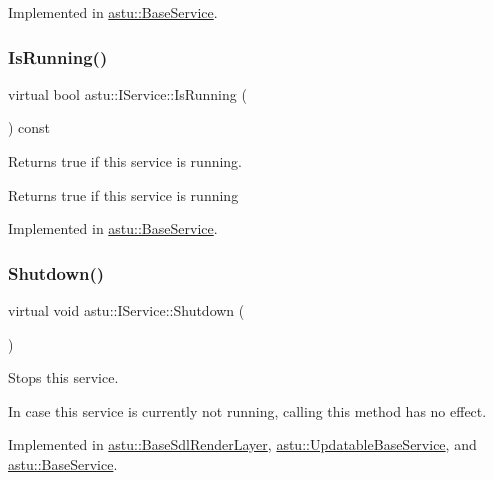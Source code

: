 Implemented in \hyperlink{classastu_1_1BaseService_a42eb6e0d667215ef635682d2a12e1631}{astu\+::\+Base\+Service}.

\mbox{\label{classastu_1_1IService_ab69225f6a613c8829c45d23158fba775}} 
\subsubsection{\texorpdfstring{Is\+Running()}{IsRunning()}}
{\footnotesize\ttfamily virtual bool astu\+::\+I\+Service\+::\+Is\+Running (\begin{DoxyParamCaption}{ }\end{DoxyParamCaption}) const\hspace{0.3cm}{\ttfamily [pure virtual]}}

Returns {\ttfamily true} if this service is running.

\begin{DoxyReturn}{Returns}
{\ttfamily true} if this service is running 
\end{DoxyReturn}


Implemented in \hyperlink{classastu_1_1BaseService_af6f4641c045343d329a0fc1ecc6a9778}{astu\+::\+Base\+Service}.

\mbox{\label{classastu_1_1IService_a67643385e7cc17c31e0b3b49672b5856}} 
\subsubsection{\texorpdfstring{Shutdown()}{Shutdown()}}
{\footnotesize\ttfamily virtual void astu\+::\+I\+Service\+::\+Shutdown (\begin{DoxyParamCaption}{ }\end{DoxyParamCaption})\hspace{0.3cm}{\ttfamily [pure virtual]}}

Stops this service.

In case this service is currently not running, calling this method has no effect. 

Implemented in \hyperlink{classastu_1_1BaseSdlRenderLayer_a786ae49f41873d498ae0d22a0f3a5349}{astu\+::\+Base\+Sdl\+Render\+Layer}, \hyperlink{classastu_1_1UpdatableBaseService_a7ad7e0201007878b6014361dd5ba82f9}{astu\+::\+Updatable\+Base\+Service}, and \hyperlink{classastu_1_1BaseService_a7095888244052db294d58738c0d187fb}{astu\+::\+Base\+Service}.

